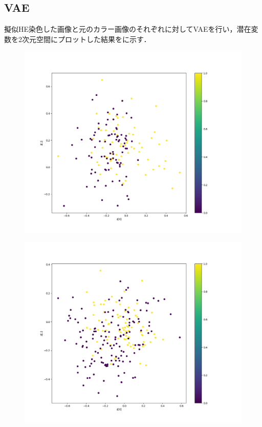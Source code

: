\subsection{VAE}
擬似HE染色した画像と元のカラー画像のそれぞれに対してVAEを行い，潜在変数を2次元空間にプロットした結果をに示す．

\begin{figure}[H]
	\centering
	
	\begin{minipage}[b]{0.45\columnwidth}
		\centering
		\includegraphics[clip, width=\linewidth]{fig/variational_auto_encoder/vae_colon_epoch_100_c13_he}
		\label{fig:}
	\end{minipage}
	\begin{minipage}[b]{0.45\columnwidth}
		\centering
		\includegraphics[clip, width=\linewidth]{fig/variational_auto_encoder/vae_colon_epoch_299_c13_rgb}

\end{minipage}
\end{figure}
